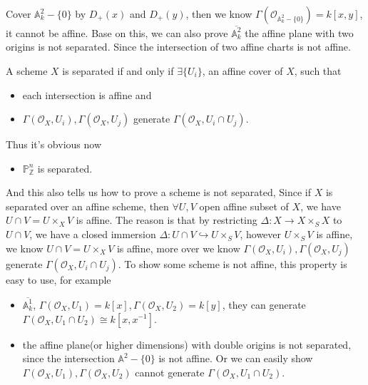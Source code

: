 \documentclass[../main.tex]{subfiles}
\begin{document}
\begin{example}
Cover $\mathbb{A}_{k}^{2}-\{0\}$ by $D_{+}(x)$ and $D_{+}(y)$, then we know  $\Gamma(\mathcal{O}_{\mathbb{A}_{k}^{2}-\{0\}})=k[x,y]$, it cannot be affine. Base on this, we can also prove $\overline{\mathbb{A}_{k}^{2}}$ the affine plane with two origins is not separated. Since the intersection of two affine charts is not affine. 
\end{example}
\begin{example}
A scheme $X$ is separated if and only  if $\exists \{U_{i}\}$, an affine cover of $X$, such that 
\begin{itemize}
\item each intersection is affine and
\item ${\Gamma(\mathcal{O}_X, U_i), \Gamma(\mathcal{O}_X,  U_j)}$ generate ${\Gamma(\mathcal{O}_X, U_i  \cap U_j)}$.
\end{itemize}
Thus it's obvious now 
\begin{itemize}
\item $\mathbb{P}_{\mathbb{Z}}^{n}$ is separated.
\end{itemize}
And this also tells us how to prove a scheme is not separated, Since if $X$ is separated over an affine scheme, then $\forall U, V$ open affine subset of $X$, we have $U\cap V=U\times_{X}V$ is affine. The reason is that by restricting $\Delta:X\rightarrow X\times_{S}X$ to $U\cap V$, we have a closed immersion $\Delta: U\cap V\hookrightarrow U\times_{S}V$, however $U\times_{S}V$ is affine, we know $U\cap V=U\times_{X}V$ is affine, more over we know $\Gamma(\mathcal{O}_X, U_i), \Gamma(\mathcal{O}_X,  U_j)$ generate $\Gamma(\mathcal{O}_X, U_i\cap U_{j})$. To show some scheme is not affine, this property is easy to use, for example
\begin{itemize}
 \item $\overline{\mathbb{A}_{k}^{1}}$, $\Gamma(\mathcal{O}_X, U_1)=k[x], \Gamma(\mathcal{O}_X,  U_2)=k[y]$, they can generate $\Gamma(\mathcal{O}_X, U_1\cap U_{2})\cong k[x,x^{-1}]$.
 \item the affine plane(or higher dimensions) with double origins is not separated, since the intersection $\mathbb{A}^{2}-\{0\}$ is not affine. Or we can easily show $\Gamma(\mathcal{O}_X, U_1), \Gamma(\mathcal{O}_X,  U_2)$ cannot generate $\Gamma(\mathcal{O}_X, U_1\cap U_{2})$.
\end{itemize}

\end{example}
\end{document}
